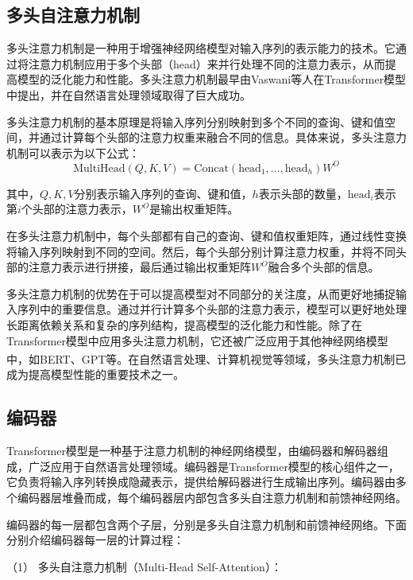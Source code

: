 \subsection{多头自注意力机制}
多头注意力机制是一种用于增强神经网络模型对输入序列的表示能力的技术。它通过将注意力机制应用于多个头部（head）来并行处理不同的注意力表示，从而提高模型的泛化能力和性能。多头注意力机制最早由Vaswani等人在Transformer模型中提出，并在自然语言处理领域取得了巨大成功。

多头注意力机制的基本原理是将输入序列分别映射到多个不同的查询、键和值空间，并通过计算每个头部的注意力权重来融合不同的信息。具体来说，多头注意力机制可以表示为以下公式：
\begin{equation}
	\text{MultiHead}(Q, K, V) = \text{Concat}(\text{head}_1, ..., \text{head}_h)W^O
\end{equation}



其中，$Q, K, V$分别表示输入序列的查询、键和值，$h$表示头部的数量，$\text{head}_i$表示第$i$个头部的注意力表示，$W^O$是输出权重矩阵。

在多头注意力机制中，每个头部都有自己的查询、键和值权重矩阵，通过线性变换将输入序列映射到不同的空间。然后，每个头部分别计算注意力权重，并将不同头部的注意力表示进行拼接，最后通过输出权重矩阵$W^O$融合多个头部的信息。

多头注意力机制的优势在于可以提高模型对不同部分的关注度，从而更好地捕捉输入序列中的重要信息。通过并行计算多个头部的注意力表示，模型可以更好地处理长距离依赖关系和复杂的序列结构，提高模型的泛化能力和性能。除了在Transformer模型中应用多头注意力机制，它还被广泛应用于其他神经网络模型中，如BERT\textsuperscript{\cite{kenton2019bert}}、GPT\textsuperscript{\cite{floridi2020gpt}}等。在自然语言处理、计算机视觉等领域，多头注意力机制已成为提高模型性能的重要技术之一。
 
\subsection{编码器}
Transformer模型是一种基于注意力机制的神经网络模型，由编码器和解码器组成，广泛应用于自然语言处理领域。编码器是Transformer模型的核心组件之一，它负责将输入序列转换成隐藏表示，提供给解码器进行生成输出序列。编码器由多个编码器层堆叠而成，每个编码器层内部包含多头自注意力机制和前馈神经网络。

编码器的每一层都包含两个子层，分别是多头自注意力机制和前馈神经网络。下面分别介绍编码器每一层的计算过程：

（1） 多头自注意力机制（Multi-Head Self-Attention）：


